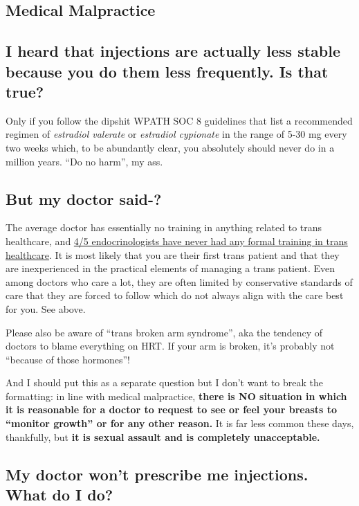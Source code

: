 \documentclass{article}
\begin{document}
\subsection*{Medical Malpractice}

\subsection{I heard that injections are actually less stable because you do them less frequently. Is that true?}

Only if you follow the dipshit WPATH SOC 8 guidelines that list a recommended regimen of \textit{estradiol valerate} or \textit{estradiol cypionate} in the range of 5-30 mg every two weeks which, to be abundantly clear, you absolutely should never do in a million years. “Do no harm”, my ass.

\subsection{But my doctor said-?}

The average doctor has essentially no training in anything related to trans healthcare, and \href{https://www.endocrine.org/news-and-advocacy/news-room/2017/endocrinologists-want-training-in-transgender-care}{4/5 endocrinologists have never had any formal training in trans healthcare}. It is most likely that you are their first trans patient and that they are inexperienced in the practical elements of managing a trans patient. Even among doctors who care a lot, they are often limited by conservative standards of care that they are forced to follow which do not always align with the care best for you. See above.

Please also be aware of “trans broken arm syndrome”, aka the tendency of doctors to blame everything on HRT. If your arm is broken, it's probably not “because of those hormones”!

And I should put this as a separate question but I don't want to break the formatting: in line with medical malpractice, \textbf{there is NO situation in which it is reasonable for a doctor to request to see or feel your breasts to “monitor growth” or for any other reason.} It is far less common these days, thankfully, but \textbf{it is sexual assault and is completely unacceptable.}

\subsection{My doctor won’t prescribe me injections. What do I do?}
\end{document}

